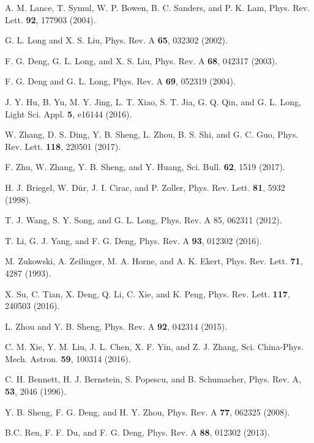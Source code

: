 \documentclass[aps,graphicx,twocolumn]{revtex4}%
\begin{document}
\begin{thebibliography}{199}
 A. M. Lance, T. Symul, W. P.  Bowen, B. C. Sanders, and P. K. Lam,   Phys.
Rev. Lett. \textbf{92}, 177903 (2004).




G. L. Long and X. S. Liu,   {Phys. Rev. A} \textbf{65},
032302 (2002).

F. G. Deng, G. L.  Long,  and X. S. Liu,
{Phys. Rev. A}  \textbf{68}, 042317 (2003).

F. G. Deng and G. L. Long,   Phys. Rev. A \textbf{69}, 052319 (2004).


J. Y. Hu, B. Yu,  M. Y. Jing,  L. T.  Xiao, S. T. Jia,  G. Q. Qin, and G. L. Long,   Light Sci. Appl. \textbf{5}, e16144 (2016).

W. Zhang,  D. S. Ding,  Y. B. Sheng, L. Zhou, B. S. Shi, and G. C. Guo,   Phys. Rev. Lett. \textbf{118}, 220501 (2017).

F. Zhu, W. Zhang,  Y. B. Sheng, and  Y. Huang,   Sci. Bull. \textbf{62}, 1519 (2017).


H. J. Briegel, W. D\"{u}r, J. I. Cirac, and P.  Zoller,   Phys. Rev.  Lett. \textbf{81}, 5932 (1998).

T. J. Wang,  S. Y. Song, and G. L.  Long,  Phys. Rev. A 85, 062311 (2012).

T. Li, G. J. Yang, and F. G. Deng,   Phys. Rev.  A \textbf{93}, 012302 (2016).



 M. Zukowski, A. Zeilinger, M. A. Horne, and A. K. Ekert,   Phys. Rev. Lett. \textbf{71}, 4287 (1993).

X. Su, C. Tian,  X. Deng,  Q. Li, C. Xie, and K. Peng,  Phys. Rev. Lett. \textbf{117}, 240503 (2016).

L. Zhou and Y. B. Sheng, Phys. Rev. A \textbf{92}, 042314 (2015).

C. M. Xie, Y. M. Liu, J. L. Chen, X. F. Yin, and Z. J. Zhang,  Sci. China-Phys. Mech. Astron. \textbf{59}, 100314 (2016).


C. H. Bennett, H. J. Bernstein,  S. Popescu, and  B. Schumacher,   Phys. Rev.  A, \textbf{53}, 2046 (1996).

 Y. B. Sheng, F. G. Deng, and H. Y. Zhou,  Phys. Rev. A \textbf{77}, 062325 (2008).


B.C. Ren, F. F. Du, and F. G. Deng,   Phys. Rev. A \textbf{88},
012302 (2013).




\end{thebibliography}
\end{document}
